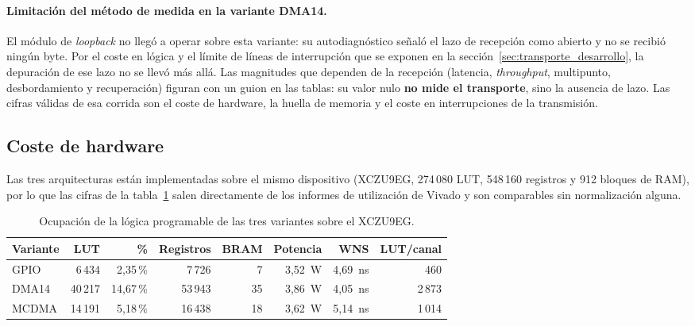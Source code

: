\paragraph{Limitación del método de medida en la variante DMA14.} El módulo de \textit{loopback}
no llegó a operar sobre esta variante: su autodiagnóstico señaló el lazo de recepción como abierto
y no se recibió ningún byte. Por el coste en lógica y el límite de líneas de interrupción que se
exponen en la sección~\ref{sec:transporte_desarrollo}, la depuración de ese lazo no se llevó más
allá. Las magnitudes que dependen de la recepción (latencia, \textit{throughput}, multipunto,
desbordamiento y recuperación) figuran con un guion en las tablas: su valor nulo \textbf{no mide
el transporte}, sino la ausencia de lazo. Las cifras válidas de esa corrida son el coste de
hardware, la huella de memoria y el coste en interrupciones de la transmisión.

\subsection{Coste de hardware}

Las tres arquitecturas están implementadas sobre el mismo dispositivo (XCZU9EG, 274\,080 LUT,
548\,160 registros y 912 bloques de RAM), por lo que las cifras de la tabla~\ref{tab:bench_hw}
salen directamente de los informes de utilización de Vivado y son comparables sin normalización
alguna.

\begin{table}[H]
    \centering
    \small
    \begin{tabular}{lrrrrrrr}
        \hline
        \textbf{Variante} & \textbf{LUT} & \textbf{\%} & \textbf{Registros} & \textbf{BRAM} & \textbf{Potencia} & \textbf{WNS} & \textbf{LUT/canal} \\
        \hline
        GPIO   & 6\,434  & 2,35\,\%  & 7\,726  & 7  & 3,52~W & 4,69~ns & 460 \\
        DMA14  & 40\,217 & 14,67\,\% & 53\,943 & 35 & 3,86~W & 4,05~ns & 2\,873 \\
        MCDMA  & 14\,191 & 5,18\,\%  & 16\,438 & 18 & 3,62~W & 5,14~ns & 1\,014 \\
        \hline
    \end{tabular}
    \caption{Ocupación de la lógica programable de las tres variantes sobre el XCZU9EG.}
    \label{tab:bench_hw}
\end{table}

